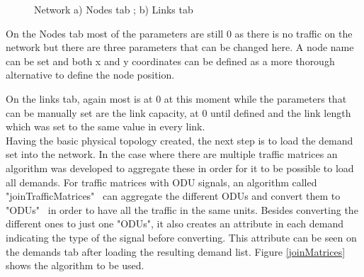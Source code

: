 	\begin{figure}[!h]
		\centering
		\caption{Network a) Nodes tab ; b) Links tab}
	\end{figure}	
	
	On the Nodes tab most of the parameters are still 0 as there is no traffic on the network but there are three parameters that can be changed here. A node name can be set and both x and y coordinates can be defined as a more thorough alternative to define the node position.
	
	On the links tab, again most is at 0 at this moment while the parameters that can be manually set are the link capacity, at 0 until defined and the link length which was set to the same value in every link.\\
	
	Having the basic physical topology created, the next step is to load the demand set into the network. In the case where there are multiple traffic matrices an algorithm was developed to aggregate these in order for it to be possible to load all demands.
	For traffic matrices with ODU signals, an algorithm called "joinTrafficMatrices" \ can aggregate the different ODUs and convert them to "ODUs" \ in order to have all the traffic in the same units. Besides converting the different ones to just one "ODUs", it also creates an attribute in each demand indicating the type of the signal before converting. This attribute can be seen on the demands tab after loading the resulting demand list. Figure \ref{joinMatrices} shows the algorithm to be used.
	

